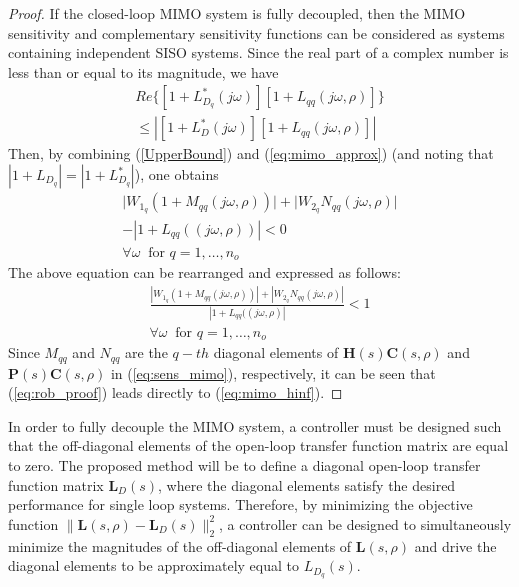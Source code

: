 \documentclass[A4, 10pt, conference]{ieeeconf}
\newcommand{\jo}{(j\omega,\rho)}
\renewcommand{\vec}[1]{\mathbf{#1}}
\begin{document}
\begin{proof} %
If the closed-loop MIMO system is fully decoupled, then the MIMO sensitivity and complementary sensitivity functions can be considered as systems containing independent SISO systems. 
Since the real part of a complex number is less than or equal to its magnitude, we have
\begin{eqnarray} \label{UpperBound}
Re\{[1+L^{\ast}_{D_{q}}(j\omega)][1+L_{qq}(j\omega,\rho)]\}
\nonumber\\ \leq |[1+L^{\ast}_D(j\omega)][1+L_{qq}(j\omega,\rho)]|
\end{eqnarray}
Then, by combining (\ref{UpperBound}) and (\ref{eq:mimo_approx}) (and noting that $|1+L_{D_{q}}|=|1+L^*_{D_{q}}|$), one obtains 				
\begin{eqnarray}
\big|W_{1_{q}}(1+M_{qq} \jo)\big| + \big | W_{2_{q}}N_{qq} \jo\big| \nonumber\\ - |1+L_{qq}(\jo)|<0 \nonumber\\
 \forall \omega \: \mbox{ for }q=1,\ldots,n_o
\end{eqnarray}
The above equation can be rearranged and expressed as follows:
\begin{eqnarray}\label{eq:rob_proof}
\frac{|W_{1_{q}}(1+M_{qq}\jo)| + |W_{2_{q}}N_{qq}\jo| }{|1+L_{qq}(\jo|} <1 \nonumber\\
 \forall \omega \: \mbox{ for }q=1,\ldots,n_o 
\end{eqnarray}
Since $M_{qq}$ and $N_{qq}$ are the $q-th$ diagonal elements of $\vec{H}(s)\vec{C}(s,\rho)$ and $\vec{P}(s)\vec{C}(s,\rho)$ in (\ref{eq:sens_mimo}), respectively, it can be seen that (\ref{eq:rob_proof}) leads directly to (\ref{eq:mimo_hinf}).
\end{proof}



In order to fully decouple the MIMO system, a controller must be designed such that the off-diagonal elements of the open-loop transfer function matrix are equal to zero.
The proposed method will be to define a diagonal open-loop transfer function matrix $\vec{L}_D(s)$, where the diagonal elements satisfy the desired performance for single loop systems. Therefore, by minimizing the objective function $\| \vec{L}(s,\rho)-\vec{L}_D(s) \|_{2}^{2}$, a controller can be designed to simultaneously  minimize the magnitudes of the off-diagonal elements of $\vec{L}(s,\rho)$ and drive the diagonal elements to be approximately equal to $L_{D_{q}}(s)$.
\end{document}
